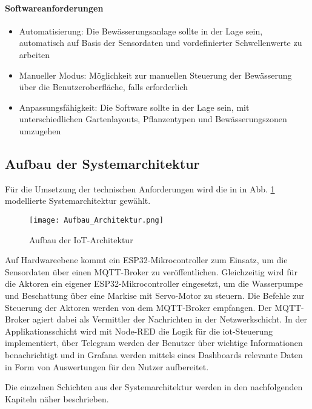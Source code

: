 \paragraph{Softwareanforderungen}
\begin{itemize}
  \item Automatisierung: Die Bewässerungsanlage sollte in der Lage sein, automatisch auf Basis der Sensordaten und vordefinierter Schwellenwerte zu arbeiten
  \item Manueller Modus: Möglichkeit zur manuellen Steuerung der Bewässerung über die Benutzeroberfläche, falls erforderlich
  \item Anpassungsfähigkeit: Die Software sollte in der Lage sein, mit unterschiedlichen Gartenlayouts, Pflanzentypen und Bewässerungszonen umzugehen
\end{itemize}


\subsection{Aufbau der Systemarchitektur}

Für die Umsetzung der technischen Anforderungen wird die in in Abb. \ref{fig:iotschichten} modellierte Systemarchitektur gewählt.

\begin{figure}[h]
  \centering
  \texttt{[image: Aufbau\_Architektur.png]}
  \caption{Aufbau der IoT-Architektur}\label{fig:iotschichten}
\end{figure}

Auf Hardwareebene kommt ein ESP32-Mikrocontroller zum Einsatz, um die Sensordaten über einen MQTT-Broker zu veröffentlichen. Gleichzeitig wird für die Aktoren ein eigener ESP32-Mikrocontroller eingesetzt, um die Wasserpumpe und Beschattung über eine Markise mit Servo-Motor zu steuern. Die Befehle zur Steuerung der Aktoren werden von dem MQTT-Broker empfangen. Der MQTT-Broker agiert dabei als Vermittler der Nachrichten in der Netzwerkschicht. In der Applikationsschicht wird mit Node-RED die Logik für die \gls{iot}-Steuerung implementiert, über Telegram werden der Benutzer über wichtige Informationen benachrichtigt und in Grafana werden mittels eines Dashboards relevante Daten in Form von Auswertungen für den Nutzer aufbereitet.

Die einzelnen Schichten aus der Systemarchitektur werden in den nachfolgenden Kapiteln näher beschrieben.